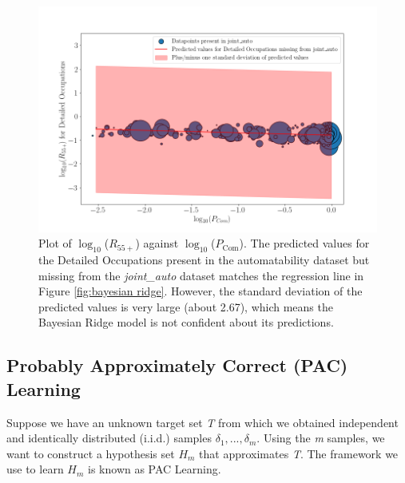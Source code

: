 \documentclass[11pt]{article}
\begin{document}
\begin{figure}[!htb]
	\centering
	\includegraphics[width=15cm]{Figures/Bayesian predicted2.png}
	\caption{Plot of $\log_{10}$($R_{55+}$) against $\log_{10}$($P_{\text{Com}}$). The predicted values for the Detailed Occupations present in the automatability dataset but missing from the \emph{joint\_auto} dataset matches the regression line in Figure \ref{fig:bayesian ridge}. However, the standard deviation of the predicted values is very large (about 2.67), which means the Bayesian Ridge model is not confident about its predictions.}
	\label{fig:baysian predicted}
\end{figure}



\subsection{Probably Approximately Correct (PAC) Learning}
\label{subsec:PAC}
Suppose we have an unknown target set \emph{T} from which we obtained independent and identically distributed (i.i.d.) samples $\delta_{1},...,\delta_{m}$. Using the \emph{m} samples, we want to construct a hypothesis set $H_{m}$ that approximates \emph{T}. The framework we use to learn $H_{m}$ is known as PAC Learning.
\end{document}

